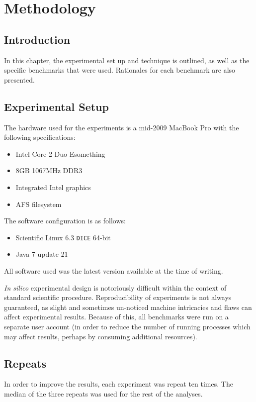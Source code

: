 \chapter{Methodology} \label{chp:methodology}
\section{Introduction} \label{sec:methodology/introduction}
In this chapter, the experimental set up and technique is outlined, as well as the specific benchmarks that were used. Rationales for each benchmark are also presented.

\section{Experimental Setup} \label{sec:methodology/setup}
The hardware used for the experiments is a mid-2009 MacBook Pro with the following specifications:
	
\begin{itemize}
	\item Intel Core 2 Duo Esomething
	\item 8GB 1067MHz DDR3
	\item Integrated Intel graphics
	\item AFS filesystem
\end{itemize}

The software configuration is as follows:
\begin{itemize}
	\item Scientific Linux 6.3 \texttt{DICE} 64-bit
	\item Java 7 update 21
\end{itemize}

All software used was the latest version available at the time of writing.

\textit{In silico} experimental design is notoriously difficult within the context of standard scientific procedure. Reproducibility of experiments is not always guaranteed, as slight and sometimes un-noticed machine intricacies and flaws can affect experimental results. Because of this, all benchmarks were run on a separate user account (in order to reduce the number of running processes which may affect results, perhaps by consuming additional resources).

\section{Repeats} \label{sec:methodology/repeats}
In order to improve the results, each experiment was repeat ten times. The median of the three repeats was used for the rest of the analyses.
	
